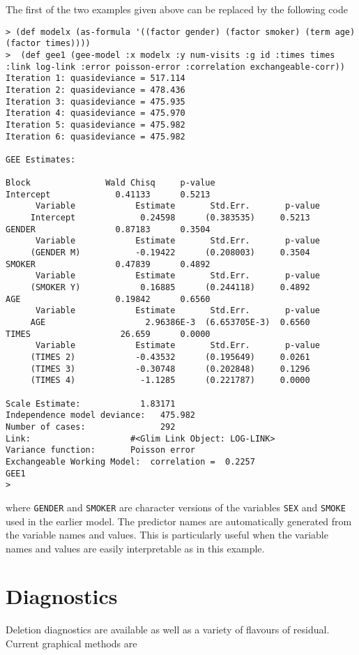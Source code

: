 \documentclass[10pt]{article}
\begin{document}
The first of the two examples given above can be replaced by the following code
\begin{verbatim}
> (def modelx (as-formula '((factor gender) (factor smoker) (term age) 
(factor times))))
>  (def gee1 (gee-model :x modelx :y num-visits :g id :times times 
:link log-link :error poisson-error :correlation exchangeable-corr))
Iteration 1: quasideviance = 517.114
Iteration 2: quasideviance = 478.436
Iteration 3: quasideviance = 475.935
Iteration 4: quasideviance = 475.970
Iteration 5: quasideviance = 475.982
Iteration 6: quasideviance = 475.982

GEE Estimates:

Block               Wald Chisq     p-value
Intercept             0.41133      0.5213
      Variable            Estimate       Std.Err.       p-value
     Intercept             0.24598      (0.383535)     0.5213
GENDER                0.87183      0.3504
      Variable            Estimate       Std.Err.       p-value
     (GENDER M)           -0.19422      (0.208003)     0.3504
SMOKER                0.47839      0.4892
      Variable            Estimate       Std.Err.       p-value
     (SMOKER Y)            0.16885      (0.244118)     0.4892
AGE                   0.19842      0.6560
      Variable            Estimate       Std.Err.       p-value
     AGE                    2.96386E-3  (6.653705E-3)  0.6560
TIMES                  26.659      0.0000
      Variable            Estimate       Std.Err.       p-value
     (TIMES 2)            -0.43532      (0.195649)     0.0261
     (TIMES 3)            -0.30748      (0.202848)     0.1296
     (TIMES 4)             -1.1285      (0.221787)     0.0000

Scale Estimate:            1.83171    
Independence model deviance:   475.982    
Number of cases:               292
Link:                    #<Glim Link Object: LOG-LINK>
Variance function:       Poisson error
Exchangeable Working Model:  correlation =  0.2257
GEE1
>
\end{verbatim}
where \texttt{GENDER} and \texttt{SMOKER} are character versions of the variables \texttt{SEX} and \texttt{SMOKE} used in the earlier model.  The predictor names are automatically generated from the variable names and values. This is particularly useful when the variable names and values are easily interpretable as in this example.

\section{Diagnostics}
Deletion diagnostics are available as well as a variety of flavours of residual. Current graphical methods are
\end{document}
